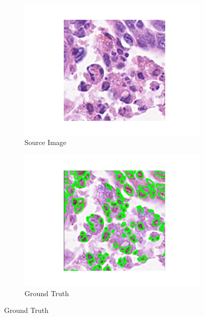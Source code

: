 \documentclass[target=bach,aauheader=,style=]{thud}
\begin{document}
\begin{figure}[!htbp]
\centering
\begin{subfigure}{0.48\textwidth}
  \centering
  \includegraphics[width=\linewidth]{imgs/qualitative/worst/RGB/img.png}
  \caption{Source Image}
\end{subfigure}\hfill
\begin{subfigure}{0.48\textwidth}
  \centering
  \includegraphics[width=\linewidth]{imgs/qualitative/worst/contour_img.png}
  \caption{Ground Truth}
\end{subfigure}


\end{figure}
\end{document}
